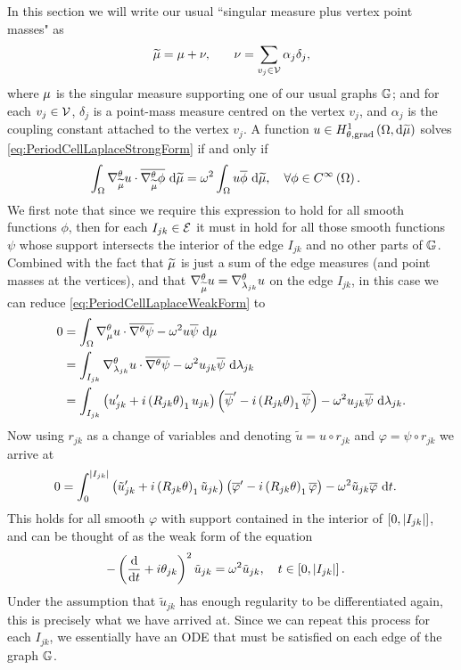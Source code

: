 In this section we will write our usual ``singular measure plus vertex point masses" as
\begin{align*}
	\widetilde{\mu} &= \mu + \nu, \quad
	& \nu = \sum_{v_j\in\mathcal{V}}\alpha_j \delta_j,
\end{align*}
where $\mu$ is the singular measure supporting one of our usual graphs $\mathbb{G}$; and for each $v_j\in\mathcal{V}$, $\delta_j$ is a point-mass measure centred on the vertex $v_j$, and $\alpha_j$ is the coupling constant attached to the vertex $v_j$.
A function $u\in H^1_{\theta, \mathrm{grad}}\left( \Omega, \mathrm{d}\widetilde{\mu} \right)$ solves \eqref{eq:PeriodCellLaplaceStrongForm} if and only if
\begin{align} \label{eq:PeriodCellLaplaceWeakForm}
	\int_{\Omega}\nabla^{\theta}_{\widetilde{\mu}}u\cdot\overline{\nabla^{\theta}_{\widetilde{\mu}}\phi} \ \mathrm{d}\widetilde{\mu} &= \omega^2\int_{\Omega}u\overline{\phi} \ \mathrm{d}\widetilde{\mu}, \quad\forall \phi\in C^{\infty}\left( \Omega \right).
\end{align}
We first note that since we require this expression to hold for all smooth functions $\phi$, then for each $I_{jk}\in \mathcal{E}$ it must in hold for all those smooth functions $\psi$ whose support intersects the interior of the edge $I_{jk}$ and no other parts of $\mathbb{G}$.
Combined with the fact that $\widetilde{\mu}$ is just a sum of the edge measures (and point masses at the vertices), and that $\nabla^{\theta}_{\widetilde{\mu}}u=\nabla^{\theta}_{\lambda_{jk}}u$ on the edge $I_{jk}$, in this case we can reduce \eqref{eq:PeriodCellLaplaceWeakForm} to
\begin{align*}
	0 &= \int_{\Omega}\nabla^{\theta}_\mu u \cdot \overline{\nabla^{\theta}\psi} - \omega^2 u\overline{\psi} \ \mathrm{d}\mu \\
	&= \int_{I_{jk}} \nabla^{\theta}_{\lambda_{jk}}u \cdot \overline{\nabla^{\theta}\psi} - \omega^2 u_{jk}\overline{\psi}  \ \mathrm{d}\lambda_{jk} \\
	&= \int_{I_{jk}} \left( u_{jk}' + i\left( R_{jk}\theta \right)_1 u_{jk} \right)\left( \overline{\psi}' - i\left( R_{jk}\theta \right)_1 \overline{\psi}  \right) - \omega^2 u_{jk}\overline{\psi}  \ \mathrm{d}\lambda_{jk}.
\end{align*}
Now using $r_{jk}$ as a change of variables and denoting $\tilde{u} = u \circ r_{jk}$ and $\varphi = \psi\circ r_{jk}$ we arrive at
\begin{align*}
	0 &= \int_{0}^{\left\lvert I_{jk} \right\rvert} \left( \tilde{u}_{jk}' + i\left( R_{jk}\theta \right)_1 \tilde{u}_{jk} \right)\left( \overline{\varphi}' - i\left( R_{jk}\theta \right)_1 \overline{\varphi}  \right) - \omega^2 \tilde{u}_{jk}\overline{\varphi} \ \mathrm{d} t .
\end{align*}
This holds for all smooth $\varphi$ with support contained in the interior of $\left[ 0,\left\lvert I_{jk} \right\rvert \right]$, and can be thought of as the weak form of the equation
\begin{align*}
	-\left( \dfrac{\mathrm{d}}{\mathrm{d}t} + i\theta_{jk} \right)^2 \tilde{u}_{jk} &= \omega^2 \tilde{u}_{jk}, \quad t\in\left[ 0,\left\lvert I_{jk} \right\rvert \right].
\end{align*}
Under the assumption that $\tilde{u}_{jk}$ has enough regularity to be differentiated again, this is precisely what we have arrived at.
Since we can repeat this process for each $I_{jk}$, we essentially have an ODE that must be satisfied on each edge of the graph $\mathbb{G}$. \newline

